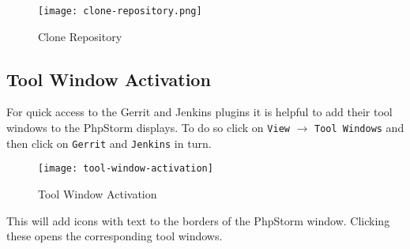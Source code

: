 \begin{figure}[h] 
	\centering
	\vspace{3pt}
	\texttt{[image: clone-repository.png]}
	\caption{Clone Repository}
\end{figure}

\subsection{Tool Window Activation}
\label{subsec:Tool-window-activation}

For quick access to the Gerrit and Jenkins plugins it is helpful to add their tool windows to the PhpStorm displays. To do so click on \texttt{View} $\rightarrow$ \texttt{Tool Windows} and then click on \texttt{Gerrit} and \texttt{Jenkins} in turn.

\begin{figure}[h] 
	\centering
	\vspace{3pt}
	\texttt{[image: tool-window-activation]}
	\caption{Tool Window Activation}
\end{figure}

\noindent
This will add icons with text to the borders of the PhpStorm window. Clicking these opens the corresponding tool windows.

